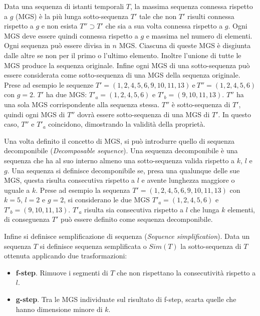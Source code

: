 Data una sequenza di istanti temporali \(T\), la massima sequenza connessa rispetto a \(g\) (MGS) è la più lunga sotto-sequenza \(T'\) tale che non \(T'\) risulti connessa rispetto a \(g\) e non esista \(T'' \supset T' \) che sia a sua volta connessa rispetto a \(g\).
Ogni MGS deve essere quindi connessa rispetto a \(g\) e massima nel numero di elementi.
Ogni sequenza può essere divisa in \(n\) MGS.
Ciascuna di queste MGS è disgiunta dalle altre se non per il primo o l'ultimo elemento.
Inoltre l'unione di tutte le MGS produce la sequenza originale.
Infine ogni MGS di una sotto-sequenza può essere considerata come sotto-sequenza di una MGS della sequenza originale.
Prese ad esempio le sequenze \(T' = (1,2,4,5,6,9,10,11,13)~\text{e}~T'' = (1,2,4,5,6)\) con \(g = 2\).
\(T'\) ha due MGS: \(T'_a = (1,2,4,5,6)\) e \(T'_b = (9,10,11,13)\).
\(T''\) ha una sola MGS corrispondente alla sequenza stessa.
\(T''\) è sotto-sequenza di \(T'\), quindi ogni MGS di \(T''\) dovrà essere sotto-sequenza di una MGS di \(T'\).
In questo caso, \(T''\) e \(T'_a\) coincidono, dimostrando la validità della proprietà.

Una volta definito il concetto di MGS, si può introdurre quello di sequenza decomponibile (\textit{Decomposable sequence}).
Una sequenza decomponibile è una sequenza che ha al suo interno almeno una sotto-sequenza valida rispetto a \(k\), \(l\) e \(g\).
Una sequenza si definisce decomponibile se, presa una qualunque delle sue MGS, questa risulta consecutiva rispetto a \(l\) e avente lunghezza maggiore o uguale a \(k\).
Prese ad esempio la sequenza \(T' = (1,2,4,5,6,9,10,11,13)\) con \(k=5\), \(l=2\) e \(g = 2\), si considerano le due MGS \(T'_a = (1,2,4,5,6)\) e \(T'_b = (9,10,11,13)\).
\(T'_a\) risulta sia consecutiva rispetto a \(l\) che lunga \(k\) elementi, di conseguenza \(T'\) può essere definito come sequenza decomponibile.

Infine si definisce semplificazione di sequenza (\textit{Sequence simplification}).
Data un sequenza \(T\) si definisce sequenza semplificata o \(Sim(T)\) la sotto-sequenza di \(T\) ottenuta applicando due trasformazioni:

\begin{itemize}
    \item \textbf{f-step}. Rimuove i segmenti di \(T\) che non rispettano la consecutività rispetto a \(l\).
    \item \textbf{g-step}. Tra le MGS individuate sul risultato di f-step, scarta quelle che hanno dimensione minore di \(k\). 
\end{itemize}

